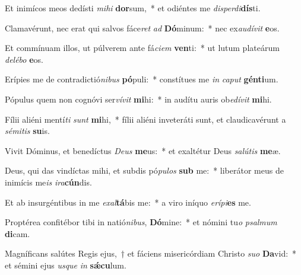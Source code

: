 \item Et inimícos meos dedísti \textit{mi}\textit{hi} \textbf{dor}sum,~* et odiéntes me \textit{dis}\textit{per}\textit{di}\textbf{dís}ti.
\item Clamavérunt, nec erat qui salvos fáce\textit{ret} \textit{ad} \textbf{Dó}minum:~* nec ex\textit{au}\textit{dí}\textit{vit} \textbf{e}os.
\item Et commínuam illos, ut púlverem ante fá\textit{ci}\textit{em} \textbf{ven}ti:~* ut lutum plateárum \textit{de}\textit{lé}\textit{bo} \textbf{e}os.
\item Erípies me de contradictió\textit{ni}\textit{bus} \textbf{pó}puli:~* constítues me \textit{in} \textit{ca}\textit{put} \textbf{gén}\textbf{ti}um.
\item Pópulus quem non cognóvi ser\textit{ví}\textit{vit} \textbf{mi}hi:~* in audítu auris ob\textit{e}\textit{dí}\textit{vit} \textbf{mi}hi.
\item Fílii aliéni mentí\textit{ti} \textit{sunt} \textbf{mi}hi,~* fílii aliéni inveteráti sunt, et claudicavérunt a \textit{sé}\textit{mi}\textit{tis} \textbf{su}is.
\item Vivit Dóminus, et benedíctus \textit{De}\textit{us} \textbf{me}us:~* et exaltétur Deus \textit{sa}\textit{lú}\textit{tis} \textbf{me}æ.
\item Deus, qui das vindíctas mihi, et subdis pó\textit{pu}\textit{los} \textbf{sub} me:~* liberátor meus de inimícis me\textit{is} \textit{i}\textit{ra}\textbf{cún}dis.
\item Et ab insurgéntibus in me \textit{ex}\textit{al}\textbf{tá}bis me:~* a viro iníquo \textit{e}\textit{rí}\textit{pi}\textbf{es} me.
\item Proptérea confitébor tibi in natió\textit{ni}\textit{bus}, \textbf{Dó}mine:~* et nómini tu\textit{o} \textit{psal}\textit{mum} \textbf{di}cam.
\item Magníficans salútes Regis ejus,~† et fáciens misericórdiam Christo \textit{su}\textit{o} \textbf{Da}vid:~* et sémini ejus \textit{us}\textit{que} \textit{in} \textbf{sǽ}\textbf{cu}lum.
